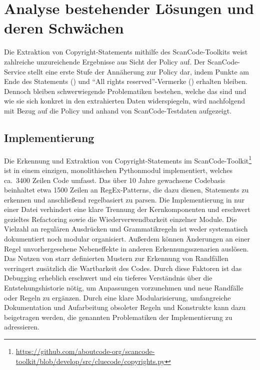 
\section{Analyse bestehender Lösungen und deren Schwächen}\label{sec:analyse-bestehender-losungen}

Die Extraktion von Copyright-Statements mithilfe des ScanCode-Toolkits weist zahlreiche unzureichende Ergebnisse aus Sicht der Policy auf.
Der ScanCode-Service stellt eine erste Stufe der Annäherung zur Policy dar, indem Punkte am Ende des Statements () und \enquote{All rights reserved}-Vermerke () erhalten bleiben.
Dennoch bleiben schwerwiegende Problematiken bestehen, welche das sind und wie sie sich konkret in den extrahierten Daten widerspiegeln, wird nachfolgend mit Bezug auf die Policy und anhand von ScanCode-Testdaten aufgezeigt.

\subsection{Implementierung}

Die Erkennung und Extraktion von Copyright-Statements im ScanCode-Toolkit\footnote{\url{https://github.com/aboutcode-org/scancode-toolkit/blob/develop/src/cluecode/copyrights.py}} ist in einem einzigen, monolithischen Pythonmodul implementiert, welches ca.\ \num{3400} Zeilen Code umfasst.
Das über \num{10} Jahre gewachsene Codebasis beinhaltet etwa \num{1500} Zeilen an RegEx-Patterns, die dazu dienen, Statements zu erkennen und anschließend regelbasiert zu parsen.
Die Implementierung in nur einer Datei verhindert eine klare Trennung der Kernkomponenten und erschwert gezieltes Refactoring sowie die Wiederverwendbarkeit einzelner Module.
Die Vielzahl an regulären Ausdrücken und Grammatikregeln ist weder systematisch dokumentiert noch modular organisiert.
Außerdem können Änderungen an einer Regel unvorhergesehene Nebeneffekte in anderen Erkennungsszenarien auslösen.
Das Nutzen von starr definierten Mustern zur Erkennung von Randfällen verringert zusätzlich die Wartbarkeit des Codes.
Durch diese Faktoren ist das Debugging erheblich erschwert und ein tieferes Verständnis über die Entstehungshistorie nötig, um Anpassungen vorzunehmen und neue Randfälle oder Regeln zu ergänzen.
Durch eine klare Modularisierung, umfangreiche Dokumentation und Aufarbeitung obsoleter Regeln und Konstrukte kann dazu beigetragen werden, die genannten Problematiken der Implementierung zu adressieren.

